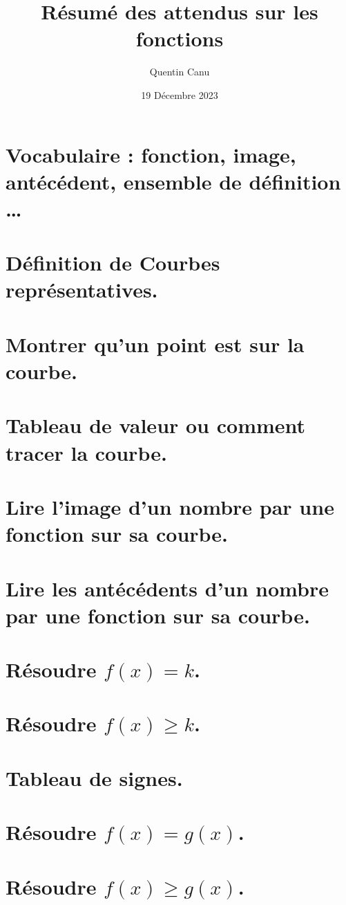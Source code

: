 \documentclass{article}
\title{Résumé des attendus sur les fonctions}
\date{19 Décembre 2023}
\author{Quentin Canu}
\begin{document}
\maketitle
\section{Vocabulaire : fonction, image, antécédent, ensemble de définition \dots}
\section{Définition de Courbes représentatives.}
\section{Montrer qu'un point est sur la courbe.}
\section{Tableau de valeur ou comment tracer la courbe.}
\section{Lire l'image d'un nombre par une fonction sur sa courbe.}
\section{Lire les antécédents d'un nombre par une fonction sur sa courbe.}
\section{Résoudre $f(x) = k$.}
\section{Résoudre $f(x) \geq k$.}
\section{Tableau de signes.}
\section{Résoudre $f(x) = g(x)$.}
\section{Résoudre $f(x) \geq g(x)$.}
\end{document}
